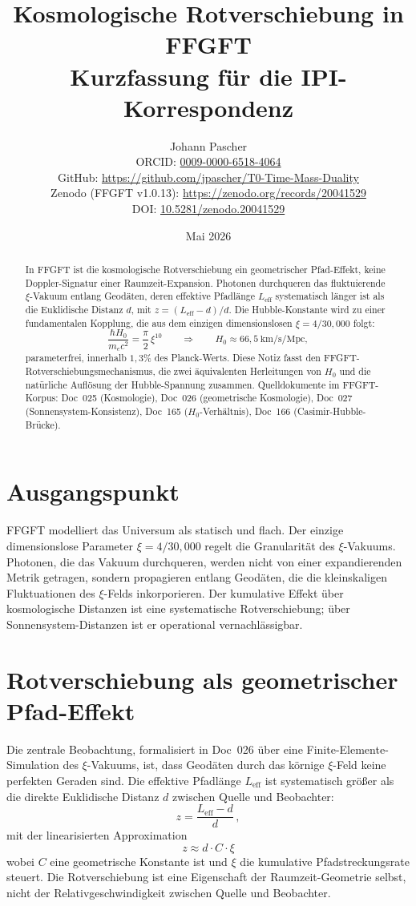 \documentclass[11pt,a4paper]{article}
\title{Kosmologische Rotverschiebung in FFGFT\\[2pt]
  \large Kurzfassung für die IPI-Korrespondenz}
\author{Johann Pascher\\[2pt]
\small ORCID: \href{https://orcid.org/0009-0000-6518-4064}{0009-0000-6518-4064}\\
\small GitHub: \url{https://github.com/jpascher/T0-Time-Mass-Duality}\\
\small Zenodo (FFGFT v1.0.13): \url{https://zenodo.org/records/20041529}\\
\small DOI: \href{https://doi.org/10.5281/zenodo.20041529}{10.5281/zenodo.20041529}}
\date{Mai 2026}
\begin{document}
\maketitle

\begin{abstract}
\noindent In FFGFT ist die kosmologische Rotverschiebung ein geometrischer Pfad-Effekt, keine Doppler-Signatur einer Raumzeit-Expansion. Photonen durchqueren das fluktuierende $\xi$-Vakuum entlang Geodäten, deren effektive Pfadlänge $L_{\mathrm{eff}}$ systematisch länger ist als die Euklidische Distanz $d$, mit $z = (L_{\mathrm{eff}} - d)/d$. Die Hubble-Konstante wird zu einer fundamentalen Kopplung, die aus dem einzigen dimensionslosen $\xi = 4/30{,}000$ folgt:
\[
\frac{\hbar H_0}{m_e c^2} = \frac{\pi}{2}\,\xi^{10} \qquad\Longrightarrow\qquad H_0 \approx 66{,}5\ \text{km/s/Mpc},
\]
parameterfrei, innerhalb $1{,}3\%$ des Planck-Werts. Diese Notiz fasst den FFGFT-Rotverschiebungsmechanismus, die zwei äquivalenten Herleitungen von $H_0$ und die natürliche Auflösung der Hubble-Spannung zusammen. Quelldokumente im FFGFT-Korpus: Doc~025 (Kosmologie), Doc~026 (geometrische Kosmologie), Doc~027 (Sonnensystem-Konsistenz), Doc~165 ($H_0$-Verhältnis), Doc~166 (Casimir-Hubble-Brücke).
\end{abstract}

\section{Ausgangspunkt}

FFGFT modelliert das Universum als statisch und flach. Der einzige dimensionslose Parameter $\xi = 4/30{,}000$ regelt die Granularität des $\xi$-Vakuums. Photonen, die das Vakuum durchqueren, werden nicht von einer expandierenden Metrik getragen, sondern propagieren entlang Geodäten, die die kleinskaligen Fluktuationen des $\xi$-Felds inkorporieren. Der kumulative Effekt über kosmologische Distanzen ist eine systematische Rotverschiebung; über Sonnensystem-Distanzen ist er operational vernachlässigbar.

\section{Rotverschiebung als geometrischer Pfad-Effekt}

Die zentrale Beobachtung, formalisiert in Doc~026 über eine Finite-Elemente-Simulation des $\xi$-Vakuums, ist, dass Geodäten durch das körnige $\xi$-Feld keine perfekten Geraden sind. Die effektive Pfadlänge $L_{\mathrm{eff}}$ ist systematisch größer als die direkte Euklidische Distanz $d$ zwischen Quelle und Beobachter:
\begin{equation}
z = \frac{L_{\mathrm{eff}} - d}{d}\,,
\label{eq:z_geometric}
\end{equation}
mit der linearisierten Approximation
\begin{equation}
z \approx d \cdot C \cdot \xi
\label{eq:z_linear}
\end{equation}
wobei $C$ eine geometrische Konstante ist und $\xi$ die kumulative Pfadstreckungsrate steuert. Die Rotverschiebung ist eine Eigenschaft der Raumzeit-Geometrie selbst, nicht der Relativgeschwindigkeit zwischen Quelle und Beobachter.
\end{document}
